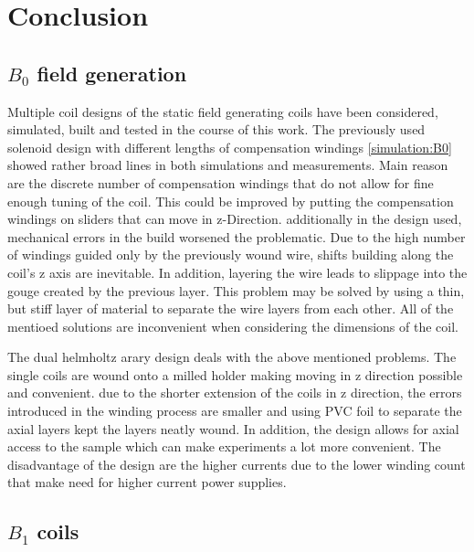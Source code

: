 \chapter{Conclusion}\label{chap:conclusion}
	\section{$B_0$ field generation}
		Multiple coil designs of the static field generating coils have been considered, simulated, built and tested in the course of this work. The previously used solenoid design with different lengths of compensation windings \ref{simulation:B0} showed rather broad lines in both simulations and measurements. Main reason are the discrete number of compensation windings that do not allow for fine enough tuning of the coil. This could be improved by putting the compensation windings on sliders that can move in z-Direction. additionally in the design used, mechanical errors in the build worsened the problematic. Due to the high number of windings guided only by the previously wound wire, shifts building along the coil's z axis are inevitable. In addition, layering the wire leads to slippage into the gouge created by the previous layer. This problem may be solved by using a thin, but stiff layer of material to separate the wire layers from each other. All of the mentioed solutions are inconvenient when considering the dimensions of the coil.
		
		The dual helmholtz arary design deals with the above mentioned problems. The single coils are wound onto a milled holder making moving in z direction possible and convenient. due to the shorter extension of the coils in z direction, the errors introduced in the winding process are smaller and using PVC foil to separate the axial layers kept the layers neatly wound.
		In addition, the design allows for axial access to the sample which can make experiments a lot more convenient. The disadvantage of the design are the higher currents due to the lower winding count that make need for higher current power supplies.
	\section{$B_1$ coils}
		
